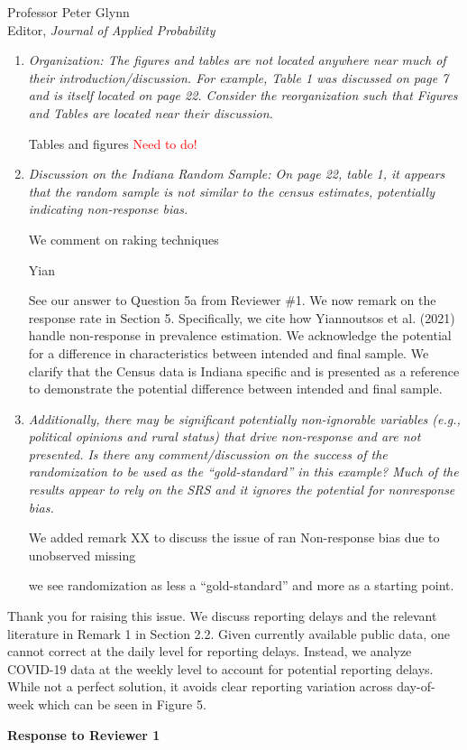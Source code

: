 \documentclass[11pt]{letter} %
\begin{document}
\begin{letter}{Professor
	Peter Glynn\\
	Editor, {\em Journal of Applied Probability}}
\begin{enumerate}
\begin{enumerate}
	\item {\it Organization: The figures and tables are not located anywhere near much of their introduction/discussion. For example, Table 1 was discussed on page 7 and is itself located on page 22. Consider the reorganization such that Figures and Tables are located near their discussion.}
	\vspace{5mm}

	Tables and figures
	\textcolor{red}{Need to do!}
	\item {\it Discussion on the Indiana Random Sample: On page 22, table 1, it appears that the random sample is not similar to the census estimates, potentially indicating non-response bias.}


    We comment on raking techniques

    Yian

    See our answer to Question 5a from Reviewer \#1.
    We now remark on the response rate in Section 5.  Specifically, we cite how Yiannoutsos et al. (2021) handle non-response in prevalence estimation.  We acknowledge the potential for a difference in characteristics between intended and final sample.  We clarify that the Census data is Indiana specific and is presented as a reference to demonstrate the potential difference between intended and final sample.


	\item {\it Additionally, there may be significant potentially non-ignorable variables (e.g., political opinions and rural status) that drive non-response and are not presented. Is there any comment/discussion on the success of the randomization to be used as the “gold-standard” in this example? Much of the results appear to rely on the SRS and it ignores the potential for nonresponse bias.}

	We added remark XX to discuss the issue of ran
	Non-response bias due to unobserved missing

	we see randomization as less a ``gold-standard'' and more as a starting point.

\end{enumerate}

\vspace{5mm}
Thank you for raising this issue.  We discuss reporting delays and the relevant literature in Remark 1 in Section 2.2.  Given currently available public data, one cannot correct at the daily level for reporting delays.  Instead, we analyze COVID-19 data at the weekly level to account for potential reporting delays.  While not a perfect solution, it avoids clear reporting variation across day-of-week which can be seen in Figure 5.
\vspace{5mm}
\end{enumerate}
\newpage
{\bf Response to Reviewer 1}
\vspace{5mm}


\end{letter}
\end{document}
